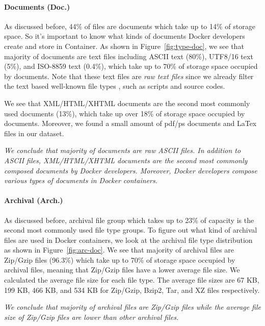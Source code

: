 \paragraph{Documents (Doc.)}
As discussed before, 44\% of files are documents which take up to 14\% of storage space. So it's important to know what kinds of documents Docker developers create and store in Container. 
As shown in Figure~\ref{fig:type-doc}, we see that majority of documents are text files including ASCII text (80\%), UTF8/16 text (5\%), and ISO-8859 text (0.4\%), which take up to 70\% of storage space occupied by documents. Note that these text files are \textit{raw text files} since we already filter the text based well-known file types%
, such as scripts and source codes.

We see that XML/HTML/XHTML documents are the second most commonly used documents (13\%), which take up over 18\% of storage space occupied by documents. Moreover, we found a small amount of pdf/ps documents and LaTex files in our dataset.%

\textit{We conclude that majority of documents are raw ASCII files.
In addition to ASCII files, XML/HTML/XHTML documents are the second most commonly composed documents by Docker developers. 
Moreover, Docker developers compose various types of documents in Docker containers.} 


\paragraph{Archival (Arch.)}
As discussed before, archival file group which takes up to 23\% of capacity is the second most commonly used file type groups. To figure out what kind of archival files are used in Docker containers, we look at the archival file type distribution as shown in Figure~\ref{fig:arc-doc}. We see that majority of archival files are Zip/Gzip files (96.3\%) which take up to 70\% of storage space occupied by archival files, meaning that Zip/Gzip files have a lower average file size. We calculated the average file size for each file type. 
The average file sizes are 67 KB, 199 KB, 466 KB, and 534 KB for Zip/Gzip, Bzip2, Tar, and XZ files respectively. 

\textit{We conclude that majority of archival files are Zip/Gzip files while the average file size of Zip/Gzip files are lower than other archival files.}

